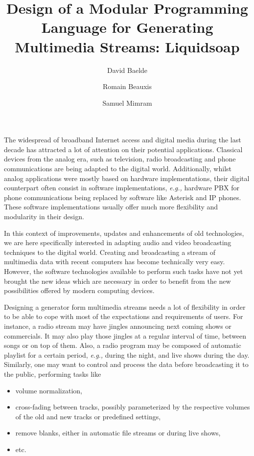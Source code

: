 \documentclass{llncs}
\title{Design of a Modular Programming Language for Generating Multimedia Streams: Liquidsoap}
\author{David Baelde \and Romain Beauxis \and Samuel Mimram}
\newcommand{\eg}{{\em e.g.,}}
\begin{document}
\maketitle

The widespread of broadband Internet access and digital media during the last
decade has attracted a lot of attention on their potential applications.
Classical devices from the analog era, such as television, radio broadcasting
and phone communications are being adapted to the digital world. Additionally,
whilst analog applications were mostly based on hardware implementations, their
digital counterpart often consist in software implementations, \eg{} hardware
PBX for phone communications being replaced by software like Asterisk and IP
phones. These software implementations usually offer much more flexibility and
modularity in their design.

In this context of improvements, updates and enhancements of old technologies,
we are here specifically interested in adapting audio and video broadcasting
techniques to the digital world. Creating and broadcasting a stream of
multimedia data with recent computers has become technically very easy. However,
the software technologies available to perform such tasks have not yet brought
the new ideas which are necessary in order to benefit from the new possibilities
offered by modern computing devices.

Designing a generator form multimedia streams needs a lot of flexibility in
order to be able to cope with most of the expectations and requirements of
users. For instance, a radio stream may have jingles announcing next coming
shows or commercials. It may also play those jingles at a regular interval of
time, between songs or on top of them. Also, a radio program may be composed of
automatic playlist for a certain period, \eg{} during the night, and live shows
during the day. Similarly, one may want to control and process the data before
broadcasting it to the public, performing tasks like
\begin{itemize}
 \item volume normalization,
 \item cross-fading between tracks, possibly parameterized by the respective
   volumes of the old and new tracks or predefined settings,
 \item remove blanks, either in automatic file streams or during live shows,
 \item etc.
\end{itemize}
\end{document}
